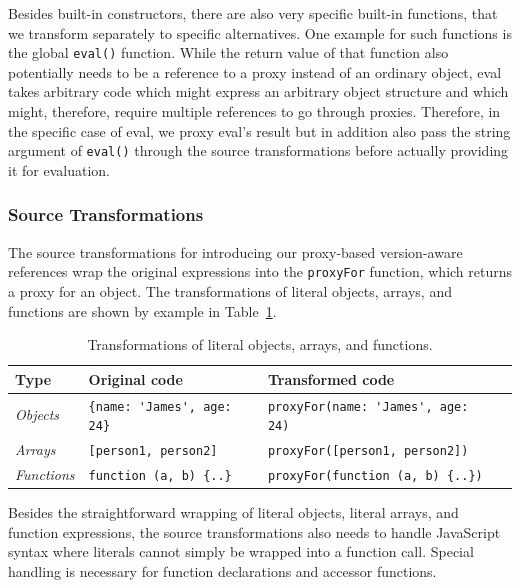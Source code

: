 Besides built-in constructors, there are also very specific built-in functions, that we transform separately to specific alternatives.
One example for such functions is the global \lstinline{eval()} function.
While the return value of that function also potentially needs to be a reference to a proxy instead of an ordinary object, eval takes arbitrary code which might express an arbitrary object structure and which might, therefore, require multiple references to go through proxies.
Therefore, in the specific case of eval, we proxy eval's result but in addition also pass the string argument of \lstinline{eval()} through the source transformations before actually providing it for evaluation.


\subsubsection{Source Transformations}

The source transformations for introducing our proxy-based version-aware references wrap the original expressions into the \lstinline{proxyFor} function, which returns a proxy for an object.
The transformations of literal objects, arrays, and functions are shown by example in Table~\ref{table:literalTransforms}.


\begin{table}[h]
\begin{center}
\begin{tabular}{| l | l | l | l |}
\hline
Type & Original code & Transformed code \\ \hline
\emph{Objects} & \lstinline|{name: 'James', age: 24}| & \lstinline|proxyFor(name: 'James', age: 24)| \\ \hline
\emph{Arrays} & \lstinline|[person1, person2]| & \lstinline|proxyFor([person1, person2])| \\ \hline
\emph{Functions} & \lstinline|function (a, b) {..}| & \lstinline|proxyFor(function (a, b) {..})| \\ \hline
\end{tabular}
\end{center}
\caption[Table caption text]{Transformations of literal objects, arrays, and functions.}
\label{table:literalTransforms}
\end{table}


Besides the straightforward wrapping of literal objects, literal arrays, and function expressions, the source transformations also needs to handle JavaScript syntax where literals cannot simply be wrapped into a function call.
Special handling is necessary for function declarations and accessor functions.

